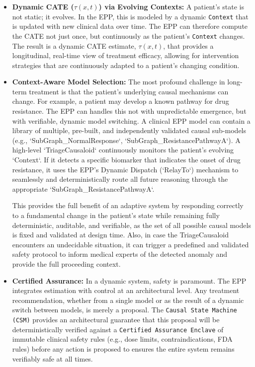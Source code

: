 \begin{itemize}
\item \textbf{Dynamic CATE ($\tau(x, t)$) via Evolving Contexts:}
A patient's state is not static; it evolves. In the EPP, this is modeled by a dynamic \texttt{Context} that is updated with new clinical data over time. The EPP can therefore compute the CATE not just once, but continuously as the patient's \texttt{Context} changes. The result is a dynamic CATE estimate, $\tau(x, t)$, that provides a longitudinal, real-time view of treatment efficacy, allowing for intervention strategies that are continuously adapted to a patient's changing condition.

\item \textbf{Context-Aware Model Selection:}
The most profound challenge in long-term treatment is that the patient's underlying causal mechanisms can change. For example, a patient may develop a known pathway for drug resistance. The EPP can handles this not with unpredictable emergence, but with verifiable, dynamic model switching. A clinical EPP model can contain a library of multiple, pre-built, and independently validated causal sub-models (e.g., `SubGraph\_NormalResponse`, `SubGraph\_ResistancePathwayA`). A high-level `TriageCausaloid` continuously monitors the patient's evolving `Context`. If it detects a specific biomarker that indicates the onset of drug resistance, it uses the EPP's Dynamic Dispatch (`RelayTo`) mechanism to seamlessly and deterministically route all future reasoning through the appropriate `SubGraph\_ResistancePathwayA`. 

This provides the full benefit of an adaptive system by responding correctly to a fundamental change in the patient's state while remaining fully deterministic, auditable, and verifiable, as the set of all possible causal models is fixed and validated at design time. Also, in case the TriageCausaloid encounters an undecidable situation, it can trigger a predefined and validated safety protocol to inform medical experts of the detected anomaly and provide the full proceeding context. 

\item \textbf{Certified Assurance:}
In a dynamic system, safety is paramount. The EPP integrates estimation with control at an architectural level. Any treatment recommendation, whether from a single model or as the result of a dynamic switch between models, is merely a proposal. The \texttt{Causal State Machine (CSM)} provides an architectural guarantee that this proposal will be deterministically verified against a \texttt{Certified Assurance Enclave} of immutable clinical safety rules (e.g., dose limits, contraindications, FDA rules) before any action is proposed to ensures the entire system remains verifiably safe at all times.

\end{itemize}


